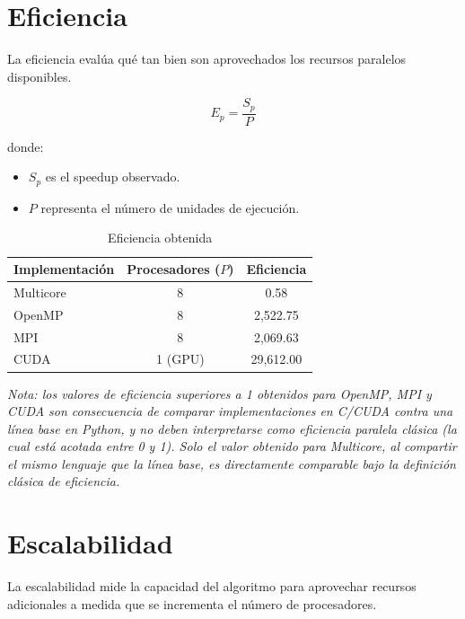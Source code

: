 \section{Eficiencia}
\label{sec:eficiencia}

La eficiencia evalúa qué tan bien son aprovechados los recursos paralelos disponibles.

\begin{equation}
E_p=
\frac{S_p}{P}
\end{equation}

donde:

\begin{itemize}
    \item $S_p$ es el speedup observado.
    \item $P$ representa el número de unidades de ejecución.
\end{itemize}

\begin{table}[H]
\centering
\caption{Eficiencia obtenida}
\begin{tabular}{lcc}
\toprule
Implementación & Procesadores ($P$) & Eficiencia \\
\midrule
Multicore & 8 & 0.58 \\
OpenMP    & 8 & 2{,}522.75 \\
MPI       & 8 & 2{,}069.63 \\
CUDA      & 1 (GPU) & 29{,}612.00 \\
\bottomrule
\end{tabular}
\end{table}

\textit{Nota: los valores de eficiencia superiores a 1 obtenidos para OpenMP, MPI y CUDA son consecuencia de comparar implementaciones en C/CUDA contra una línea base en Python, y no deben interpretarse como eficiencia paralela clásica (la cual está acotada entre 0 y 1). Solo el valor obtenido para Multicore, al compartir el mismo lenguaje que la línea base, es directamente comparable bajo la definición clásica de eficiencia.}

\section{Escalabilidad}

La escalabilidad mide la capacidad del algoritmo para aprovechar recursos adicionales a medida que se incrementa el número de procesadores.

